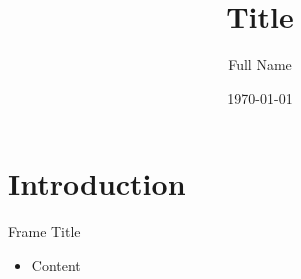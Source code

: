 \documentclass[aspectratio=169]{beamer}
\title{Title}
\author             {Full Name}
\institute          {University of Applied Sciences and Arts, Northwestern Switzerland}
\date               {\today}
\begin{document}
\maketitle

\section{Introduction}

\begin{frame}{Frame Title}
    \begin{itemize}
        \item Content
    \end{itemize}
\end{frame}
\end{document}
